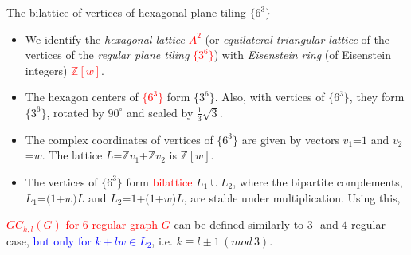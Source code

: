 \documentclass{beamer}
\begin{document}
\begin{frame}{The bilattice of vertices of hexagonal plane tiling 
$\{6^3\}$}
\vspace{-2.5mm}  
\begin{itemize}
\item We  identify the {\em hexagonal lattice}  \textcolor{red}{$A^2$} (or 
{\em equilateral triangular lattice} of the 
vertices of 
the {\em regular plane tiling}  \textcolor{red}{$\{3^6\}$})
with {\em Eisenstein ring} (of Eisenstein integers)  \textcolor{red}{$\mathbb{Z}[w]$}.
\item The hexagon centers of
\textcolor{red}{$\{6^3\}$}
form  $\{3^6\}$. Also,
with vertices of $\{6^3\}$, they form $\{3^6\}$, rotated by
 $90^{\circ}$ and scaled by $\frac{1}{3}\sqrt{3}$.



\item The complex coordinates of vertices of $\{6^3\}$ are given by vectors $v_1$=$1$
and $v_2$=$w$.
The
lattice $L$=$\mathbb{Z}v_1$+$\mathbb{Z}v_2$ is
$\mathbb{Z}[w]$.
\item
The vertices of $\{6^3\}$ form \textcolor{red}{bilattice} $L_1\cup L_2$, 
where
the bipartite complements, $L_1$=$(1$+$w)L$ and
$L_2$=$1$+$(1$+$w)L$, are stable under multiplication. Using this,
\end{itemize}

\textcolor{red}{$GC_{k,l}(G)$ for $6$-regular graph $G$}
can be  defined similarly to $3$- and $4$-regular case, \textcolor{blue}{but only for $k+lw\in L_2$}, i.e. 
$k\equiv l\pm 
1\,(mod\,3)$.

\end{frame}
\end{document}
